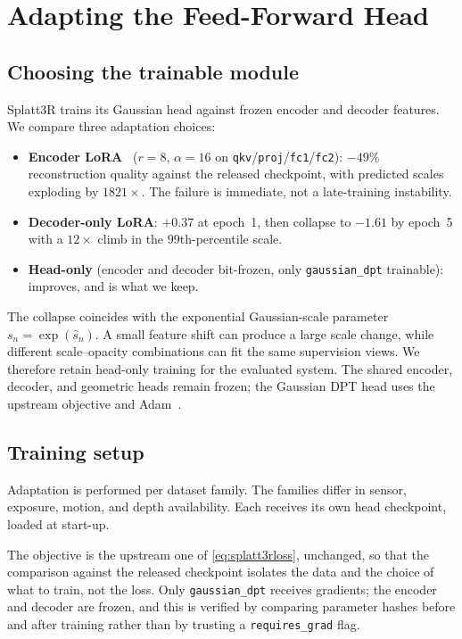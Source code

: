 \chapter{Adapting the Feed-Forward Head}
\label{ch:adapt}

\section{Choosing the trainable module}
\label{sec:method:head}

Splatt3R trains its Gaussian head against frozen encoder and decoder features.
We compare three adaptation choices:

\begin{itemize}\itemsep2pt
\item \textbf{Encoder LoRA}~\cite{hu2022lora} ($r{=}8$, $\alpha{=}16$ on
      \texttt{qkv}/\texttt{proj}/\texttt{fc1}/\texttt{fc2}):
      $-49\%$ reconstruction quality against the released checkpoint, with
      predicted scales exploding by $1821\times$. The failure is immediate,
      not a late-training instability.
\item \textbf{Decoder-only LoRA}: $+0.37$\dB{} at epoch~1, then collapse to
      $-1.61$\dB{} by epoch~5 with a $12\times$ climb in the $99$th-percentile
      scale.
\item \textbf{Head-only} (encoder and decoder bit-frozen, only
      \texttt{gaussian\_dpt} trainable): improves, and is what we keep.
\end{itemize}

The collapse coincides with the exponential Gaussian-scale parameter
$s_n=\exp(\hat{s}_n)$. A small feature shift can produce a large scale change,
while different scale--opacity combinations can fit the same supervision
views. We therefore retain head-only training for the evaluated system.
The shared encoder, decoder, and geometric heads remain frozen; the Gaussian
DPT head uses the upstream objective and Adam~\cite{kingma2015adam}.

\section{Training setup}
\label{sec:adapt:setup}

Adaptation is performed per dataset family. The families differ in sensor,
exposure, motion, and depth availability. Each receives its own head
checkpoint, loaded at start-up.

The objective is the upstream one of \cref{eq:splatt3rloss}, unchanged, so
that the comparison against the released checkpoint isolates the data and the
choice of what to train, not the loss. Only \texttt{gaussian\_dpt} receives
gradients; the encoder and decoder are frozen, and this is verified by
comparing parameter hashes before and after training rather than by trusting
a \texttt{requires\_grad} flag.

